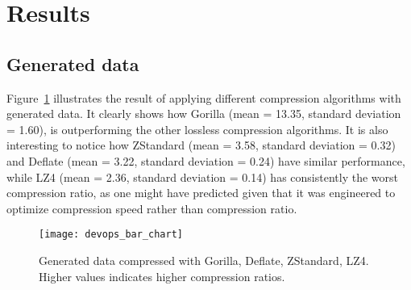 \section{Results}
\subsection{Generated data}
Figure~\ref{devops_lossless_compression} illustrates the result of applying different compression algorithms
with generated data. It clearly shows how Gorilla (mean = 13.35, standard deviation = 1.60), is outperforming the other
lossless compression algorithms.
It is also interesting to notice how ZStandard (mean = 3.58, standard deviation = 0.32) and Deflate
(mean = 3.22, standard deviation = 0.24)
have similar performance, while LZ4 (mean = 2.36, standard deviation = 0.14) has
consistently the worst compression ratio, as one might have predicted given that it was engineered to optimize compression speed rather
than compression ratio.

\begin{figure}[!htbp]
\begin{center}
\texttt{[image: devops\_bar\_chart]}
\caption[compression]{Generated data compressed with Gorilla, Deflate, ZStandard, LZ4.
Higher values indicates higher compression ratios.}
\label{devops_lossless_compression}
\end{center}
\end{figure}

